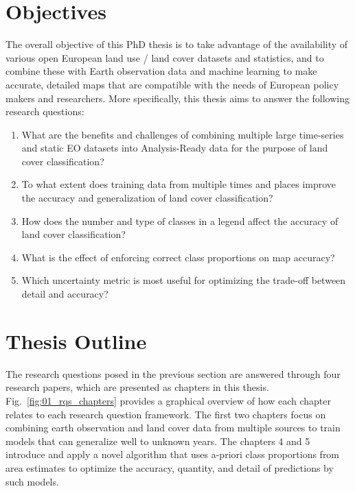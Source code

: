 \section{Objectives}
\label{sec:research_objectives}
The overall objective of this PhD thesis is to take advantage of the availability of various open European land use / land cover datasets and statistics, and to combine these with Earth observation data and machine learning to make accurate, detailed maps that are compatible with the needs of European policy makers and researchers. More specifically, this thesis aims to answer the following research questions:

\begin{enumerate}
\item %
What are the benefits and challenges of combining multiple large time-series and static EO datasets into Analysis-Ready data for the purpose of land cover classification?
\item %
To what extent does training data from multiple times and places improve the accuracy and generalization of land cover classification?
\item %
How does the number and type of classes in a legend affect the accuracy of land cover classification?
\item %
What is the effect of enforcing correct class proportions on map accuracy?
\item %
Which uncertainty metric is most useful for optimizing the trade-off between detail and accuracy?
\end{enumerate}

\section{Thesis Outline}

The research questions posed in the previous section are answered through four research papers, which are presented as chapters in this thesis. Fig.\@~\ref{fig:01_rqs_chapters} provides a graphical overview of how each chapter relates to each research question framework. The first two chapters focus on combining earth observation and land cover data from multiple sources to train models that can generalize well to unknown years. The chapters 4 and 5 introduce and apply a novel algorithm that uses a-priori class proportions from area estimates to optimize the accuracy, quantity, and detail of predictions by such models.

